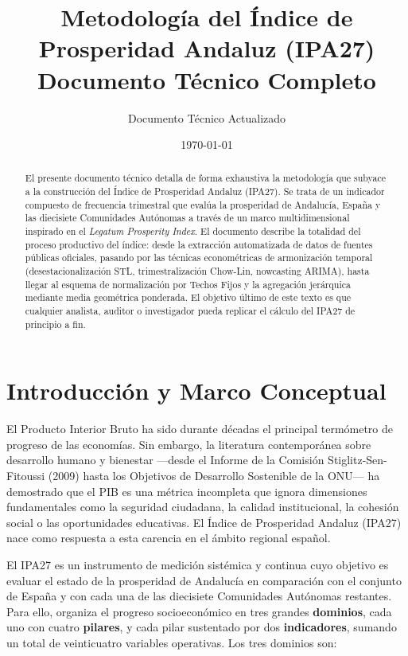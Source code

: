 \documentclass[12pt,a4paper]{article}
\title{\textbf{Metodología del Índice de Prosperidad Andaluz (IPA27)} \\ \large Documento Técnico Completo}
\author{Documento Técnico Actualizado}
\date{\today}
\begin{document}
\maketitle

\begin{abstract}
El presente documento técnico detalla de forma exhaustiva la metodología que subyace a la construcción del Índice de Prosperidad Andaluz (IPA27). Se trata de un indicador compuesto de frecuencia trimestral que evalúa la prosperidad de Andalucía, España y las diecisiete Comunidades Autónomas a través de un marco multidimensional inspirado en el \textit{Legatum Prosperity Index}. El documento describe la totalidad del proceso productivo del índice: desde la extracción automatizada de datos de fuentes públicas oficiales, pasando por las técnicas econométricas de armonización temporal (desestacionalización STL, trimestralización Chow-Lin, nowcasting ARIMA), hasta llegar al esquema de normalización por Techos Fijos y la agregación jerárquica mediante media geométrica ponderada. El objetivo último de este texto es que cualquier analista, auditor o investigador pueda replicar el cálculo del IPA27 de principio a fin.
\end{abstract}

\tableofcontents
\newpage

\section{Introducción y Marco Conceptual}

El Producto Interior Bruto ha sido durante décadas el principal termómetro de progreso de las economías. Sin embargo, la literatura contemporánea sobre desarrollo humano y bienestar ---desde el Informe de la Comisión Stiglitz-Sen-Fitoussi (2009) hasta los Objetivos de Desarrollo Sostenible de la ONU--- ha demostrado que el PIB es una métrica incompleta que ignora dimensiones fundamentales como la seguridad ciudadana, la calidad institucional, la cohesión social o las oportunidades educativas. El Índice de Prosperidad Andaluz (IPA27) nace como respuesta a esta carencia en el ámbito regional español.

El IPA27 es un instrumento de medición sistémica y continua cuyo objetivo es evaluar el estado de la prosperidad de Andalucía en comparación con el conjunto de España y con cada una de las diecisiete Comunidades Autónomas restantes. Para ello, organiza el progreso socioeconómico en tres grandes \textbf{dominios}, cada uno con cuatro \textbf{pilares}, y cada pilar sustentado por dos \textbf{indicadores}, sumando un total de veinticuatro variables operativas. Los tres dominios son:
\end{document}
